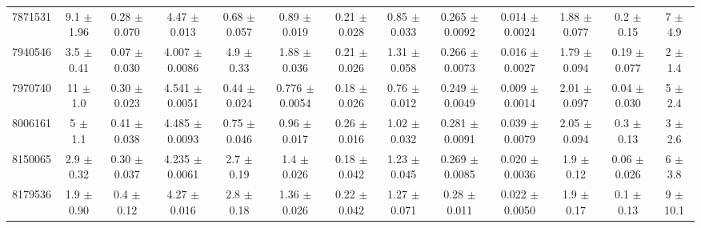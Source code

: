 \begin{table}[H]
\begin{tabular}{c|cccccc|cccccc}
7871531  &        9.1    $\pm$  1.96   &      0.28   $\pm$  0.070  &      4.47   $\pm$  0.013  &      0.68   $\pm$  0.057  &      0.89   $\pm$  0.019  &      0.21   $\pm$  0.028    &        0.85   $\pm$  0.033    &        0.265  $\pm$  0.0092   &        0.014  $\pm$  0.0024   &        1.88   $\pm$  0.077    &        0.2    $\pm$  0.15     &        7      $\pm$  4.9      \\
7940546  &        3.5    $\pm$  0.41   &      0.07   $\pm$  0.030  &      4.007  $\pm$  0.0086 &      4.9    $\pm$  0.33   &      1.88   $\pm$  0.036  &      0.21   $\pm$  0.026    &        1.31   $\pm$  0.058    &        0.266  $\pm$  0.0073   &        0.016  $\pm$  0.0027   &        1.79   $\pm$  0.094    &        0.19   $\pm$  0.077    &        2      $\pm$  1.4      \\
7970740  &       11      $\pm$  1.0    &      0.30   $\pm$  0.023  &      4.541  $\pm$  0.0051 &      0.44   $\pm$  0.024  &      0.776  $\pm$  0.0054 &      0.18   $\pm$  0.026    &        0.76   $\pm$  0.012    &        0.249  $\pm$  0.0049   &        0.009  $\pm$  0.0014   &        2.01   $\pm$  0.097    &        0.04   $\pm$  0.030    &        5      $\pm$  2.4      \\
8006161  &        5      $\pm$  1.1    &      0.41   $\pm$  0.038  &      4.485  $\pm$  0.0093 &      0.75   $\pm$  0.046  &      0.96   $\pm$  0.017  &      0.26   $\pm$  0.016    &        1.02   $\pm$  0.032    &        0.281  $\pm$  0.0091   &        0.039  $\pm$  0.0079   &        2.05   $\pm$  0.094    &        0.3    $\pm$  0.13     &        3      $\pm$  2.6      \\
8150065  &        2.9    $\pm$  0.32   &      0.30   $\pm$  0.037  &      4.235  $\pm$  0.0061 &      2.7    $\pm$  0.19   &      1.4    $\pm$  0.026  &      0.18   $\pm$  0.042    &        1.23   $\pm$  0.045    &        0.269  $\pm$  0.0085   &        0.020  $\pm$  0.0036   &        1.9    $\pm$  0.12     &        0.06   $\pm$  0.026    &        6      $\pm$  3.8      \\
8179536  &        1.9    $\pm$  0.90   &      0.4    $\pm$  0.12   &      4.27   $\pm$  0.016  &      2.8    $\pm$  0.18   &      1.36   $\pm$  0.026  &      0.22   $\pm$  0.042    &        1.27   $\pm$  0.071    &        0.28   $\pm$  0.011    &        0.022  $\pm$  0.0050   &        1.9    $\pm$  0.17     &        0.1    $\pm$  0.13     &        9      $\pm$ 10.1      \\

\end{tabular}
\end{table}
